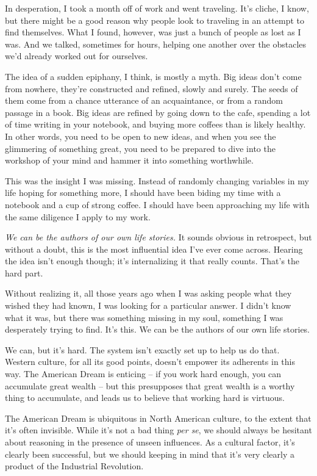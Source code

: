 \documentclass[]{book}
\newcommand{\foreign}[1]{\textit{#1}}
\newcommand{\emphasis}[1]{\textit{#1}}
\begin{document}
In desperation, I took a month off of work and went traveling. It's cliche, I
know, but there might be a good reason why people look to traveling in an
attempt to find themselves. What I found, however, was just a bunch of people as
lost as I was. And we talked, sometimes for hours, helping one another over the
obstacles we'd already worked out for ourselves.

The idea of a sudden epiphany, I think, is mostly a myth. Big ideas don't come
from nowhere, they're constructed and refined, slowly and surely. The seeds of
them come from a chance utterance of an acquaintance, or from a random passage
in a book. Big ideas are refined by going down to the cafe, spending a lot of
time writing in your notebook, and buying more coffees than is likely healthy.
In other words, you need to be open to new ideas, and when you see the
glimmering of something great, you need to be prepared to dive into the workshop
of your mind and hammer it into something worthwhile.

This was the insight I was missing. Instead of randomly changing variables in my
life hoping for something more, I should have been biding my time with a
notebook and a cup of strong coffee. I should have been approaching my life with
the same diligence I apply to my work.

\emphasis{We can be the authors of our own life stories.} It sounds obvious in
retrospect, but without a doubt, this is the most influential idea I've ever
come across. Hearing the idea isn't enough though; it's internalizing it that
really counts. That's the hard part.

Without realizing it, all those years ago when I was asking people what they
wished they had known, I was looking for a particular answer. I didn't know what
it was, but there was something missing in my soul, something I was desperately
trying to find. It's this. We can be the authors of our own life stories.

We can, but it's hard. The system isn't exactly set up to help us do that.
Western culture, for all its good points, doesn't empower its adherents in this
way.  The American Dream is enticing -- if you work hard
enough, you can accumulate great wealth -- but this presupposes that great
wealth is a worthy thing to accumulate, and leads us to believe that working
hard is virtuous.

The American Dream is ubiquitous in North American culture, to the extent that
it's often invisible. While it's not a bad thing \foreign{per se}, we should
always be hesitant about reasoning in the presence of unseen influences. As a
cultural factor, it's clearly been successful, but we should keeping in mind
that it's very clearly a product of the Industrial Revolution.
\end{document}

